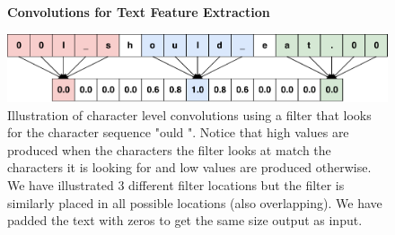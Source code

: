 \begin{figure}
    \centering
    \textbf{Convolutions for Text Feature Extraction}\par\medskip
    \includegraphics[width=\textwidth]{./pictures/experiments/convolution_example}
    \caption{Illustration of character level convolutions using a filter that
        looks for the character sequence "ould ". Notice that high values are
        produced when the characters the filter looks at match the characters it
        is looking for and low values are produced otherwise. We have
        illustrated 3 different filter locations but the filter is similarly
        placed in all possible locations (also overlapping). We have padded the
        text with zeros to get the same size output as input.}
    \label{fig:convolution_text_example}
\end{figure}

